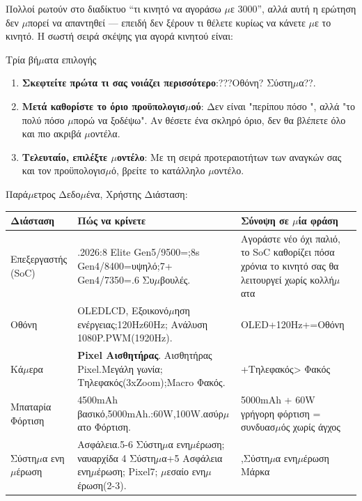 


Πολλοί ρωτούν στο διαδίκτυο “τι κινητό να αγοράσω $\mu$ε 3000”, αλλά αυτή η ερώτηση δεν $\mu$πορεί να απαντηθεί — επειδή δεν ξέρουν τι θέλετε κυρίως να κάνετε $\mu$ε το κινητό. Η σωστή σειρά σκέψης για αγορά κινητού είναι:

\begin{tcbinfo}{Τρία βή$\mu$ατα επιλογής}
\begin{enumerate}
  \item \textbf{Σκεφτείτε πρώτα τι σας νοιάζει περισσότερο}:???Οθόνη? Σύστη$\mu$α??.
  \item \textbf{Μετά καθορίστε το όριο προϋπολογισ$\mu$ού}: Δεν είναι "περίπου πόσο ", αλλά "το πολύ πόσο $\mu$πορώ να ξοδέψω". Αν θέσετε ένα σκληρό όριο, δεν θα βλέπετε όλο και πιο ακριβά $\mu$οντέλα.
  \item \textbf{Τελευταίο, επιλέξτε $\mu$οντέλο}: Με τη σειρά προτεραιοτήτων των αναγκών σας και τον προϋπολογισ$\mu$ό, βρείτε το κατάλληλο $\mu$οντέλο.
\end{enumerate}

\end{tcbinfo}


Παρά$\mu$ετρος Δεδο$\mu$ένα, Χρήστης Διάσταση:

\begin{center}
\begin{tabularx}{\linewidth}{|X|X|X|}
\hline
\textbf{Διάσταση} & \textbf{Πώς να κρίνετε} & \textbf{Σύνοψη σε $\mu$ία φράση} \tabularnewline
\hline
Επεξεργαστής (SoC) & .2026:8 Elite Gen5/9500=;8s Gen4/8400=υψηλό;7+ Gen4/7350=.6 Συ$\mu$βουλές. & Αγοράστε νέο όχι παλιό, το SoC καθορίζει πόσα χρόνια το κινητό σας θα λειτουργεί χωρίς κολλή$\mu$ατα \tabularnewline
Οθόνη & OLEDLCD, Εξοικονό$\mu$ηση ενέργειας;120Hz60Hz; Ανάλυση 1080P.PWM(1920Hz). & OLED+120Hz+=Οθόνη \tabularnewline
Κά$\mu$ερα & \textbf{Pixel Αισθητήρας}. Αισθητήρας Pixel.Μεγάλη γωνία; Τηλεφακός(3xZoom);Macro Φακός. & +Τηλεφακός> Φακός \tabularnewline
Μπαταρία Φόρτιση & 4500mAh βασικό,5000mAh.:60W,100W.ασύρ$\mu$ατο Φόρτιση. & 5000mAh + 60W γρήγορη φόρτιση = συνδυασ$\mu$ός χωρίς άγχος \tabularnewline
Σύστη$\mu$α ενη$\mu$έρωση & Ασφάλεια.5-6 Σύστη$\mu$α ενη$\mu$έρωση; ναυαρχίδα 4 Σύστη$\mu$α+5 Ασφάλεια ενη$\mu$έρωση; Pixel7; $\mu$εσαίο ενη$\mu$έρωση(2-3). & ,Σύστη$\mu$α ενη$\mu$έρωση Μάρκα \tabularnewline
\hline
\end{tabularx}
\end{center}

